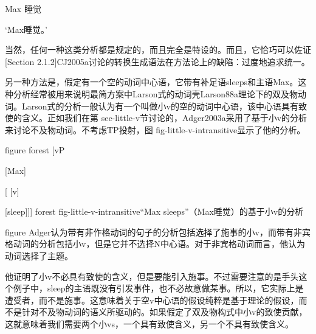 Max 睡觉 

`Max睡觉。'












当然，任何一种这类分析都是规定的，而且完全是特设的。而且，它恰巧可以佐证[Section 2.1.2]CJ2005a讨论的转换生成语法在方法论上的缺陷：过度地追求统一。






另一种方法是，假定有一个空的动词中心语，它带有补足语sleeps和主语Max。这种分析经常被用来说明最简方案中Larson式的动词壳Larson88a理论下的双及物动词。Larson式的分析一般认为有一个叫做小v的空的动词中心语，该中心语具有致使的含义。正如我们在第 sec-little-v节讨论的，Adger2003a采用了基于小v的分析来讨论不及物动词。不考虑TP投射，图 fig-little-v-intransitive显示了他的分析。






figure
forest
[vP

  [Max]

  [
    [v]

    [sleep]]]
forest
fig-little-v-intransitive“Max sleeps”（Max睡觉）的基于小v的分析

figure
Adger认为带有非作格动词的句子的分析包括选择了施事的小v，而带有非宾格动词的分析包括小v，但是它并不选择N中心语。对于非宾格动词而言，他认为动词选择了主题。




























他证明了小v不必具有致使的含义，但是要能引入施事。不过需要注意的是手头这个例子中，sleep的主语既没有引发事件，也不必故意做某事。所以，它实际上是遭受者，而不是施事。这意味着关于空v中心语的假设纯粹是基于理论的假设，而不是针对不及物动词的语义所驱动的。如果假定了双及物构式中小v的致使贡献，这就意味着我们需要两个小vs，一个具有致使含义，另一个不具有致使含义。













